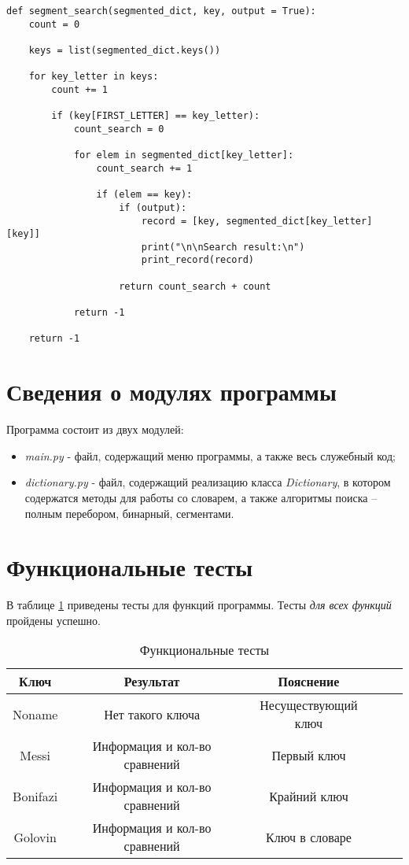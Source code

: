 \begin{center}
    \captionsetup{justification=raggedright,singlelinecheck=off}
    \begin{lstlisting}[label=lst:segm_search,caption=Алгоритм поиска в словаре с использованием сегментации]
def segment_search(segmented_dict, key, output = True):
	count = 0

	keys = list(segmented_dict.keys())

	for key_letter in keys:
		count += 1

		if (key[FIRST_LETTER] == key_letter):
			count_search = 0

			for elem in segmented_dict[key_letter]:
				count_search += 1

				if (elem == key):
					if (output):
						record = [key, segmented_dict[key_letter][key]]
						print("\n\nSearch result:\n")     
						print_record(record)

					return count_search + count

			return -1

	return -1
\end{lstlisting}
\end{center}


\section{Сведения о модулях программы}
Программа состоит из двух модулей:
\begin{itemize}
	\item \textit{main.py} - файл, содержащий меню программы, а также весь служебный код;
    \item \textit{dictionary.py} - файл, содержащий реализацию класса \textit{Dictionary}, в котором содержатся методы для работы со словарем, а также алгоритмы поиска -- полным перебором, бинарный, сегментами.
\end{itemize}


\section{Функциональные тесты}

В таблице \ref{tbl:functional_test} приведены тесты для функций программы. Тесты \textit{для всех функций} пройдены успешно.

\begin{center}
    \captionsetup{justification=raggedright,singlelinecheck=off}
    \begin{longtable}[c]{|c|c|c|c|c|}
    \caption{Функциональные тесты\label{tbl:functional_test}} \\ \hline
		\textbf{Ключ} & \textbf{Результат} & \textbf{Пояснение} \\ \hline
		Noname & Нет такого ключа & Несуществующий ключ \\ \hline
		Messi & Информация и кол-во сравнений & Первый ключ \\ \hline
		Bonifazi & Информация и кол-во сравнений & Крайний ключ \\ \hline
		Golovin & Информация и кол-во сравнений & Ключ в словаре \\
		\hline
	\end{longtable}
\end{center}

